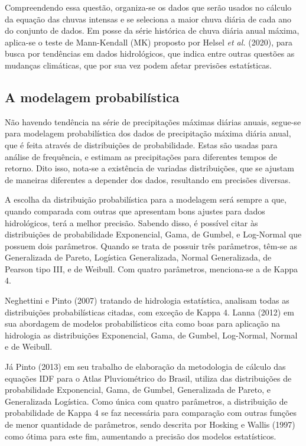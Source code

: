 Compreendendo essa questão, organiza-se os dados que serão usados no cálculo da equação das chuvas intensas e se seleciona a maior chuva diária de cada ano do conjunto de dados. Em posse da série histórica de chuva diária anual máxima, aplica-se o teste de Mann-Kendall (MK) proposto por Helsel \textit{et al.} (2020), para busca por tendências em dados hidrológicos, que indica entre outras questões as mudanças climáticas, que por sua vez podem afetar previsões estatísticas.

\subsection{A modelagem probabilística}

Não havendo tendência na série de precipitações máximas diárias anuais, segue-se para modelagem probabilística dos dados de precipitação máxima diária anual, que é feita através de distribuições de probabilidade. Estas são usadas para análise de frequência, e estimam as precipitações para diferentes tempos de retorno. Dito isso, nota-se a existência de variadas distribuições, que se ajustam de maneiras diferentes a depender dos dados, resultando em precisões diversas. 

A escolha da distribuição probabilística para a modelagem será sempre a que, quando comparada com outras que apresentam bons ajustes para dados hidrológicos, terá a melhor precisão. Sabendo disso, é possível citar às distribuições de probabilidade Exponencial, Gama, de Gumbel, e Log-Normal que possuem dois parâmetros. Quando se trata de possuir três parâmetros, têm-se as Generalizada de Pareto, Logística Generalizada, Normal Generalizada, de Pearson tipo III, e de Weibull. Com quatro parâmetros, menciona-se a de Kappa 4.

Neghettini e Pinto (2007) tratando de hidrologia estatística, analisam todas as distribuições probabilísticas citadas, com exceção de Kappa 4. Lanna (2012) em sua abordagem de modelos probabilísticos cita como boas para aplicação na hidrologia as distribuições Exponencial, Gama, de Gumbel, Log-Normal, Normal e de Weibull. 

Já Pinto (2013) em seu trabalho de elaboração da metodologia de cálculo das equações IDF para o Atlas Pluviométrico do Brasil, utiliza das distribuições de probabilidade Exponencial, Gama, de Gumbel, Generalizada de Pareto, e Generalizada Logística. Como única com quatro parâmetros, a distribuição de probabilidade de Kappa 4 se faz necessária para comparação com outras funções de menor quantidade de parâmetros, sendo descrita por Hosking e Wallis (1997) como ótima para este fim, aumentando a precisão dos modelos estatísticos.


